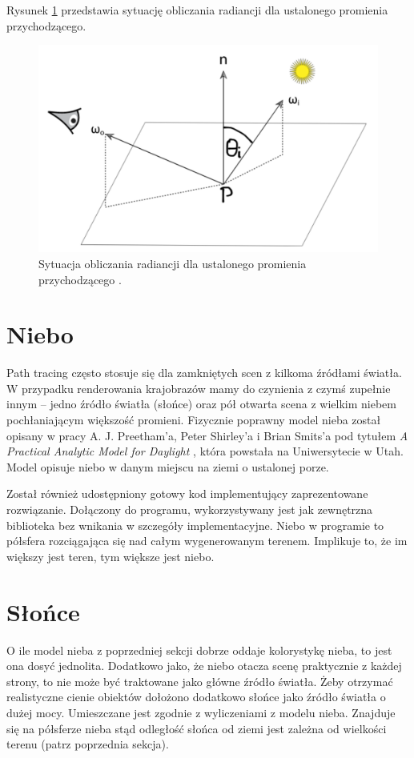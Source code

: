 \documentclass[inz,shortabstract]{iithesis}
\begin{document}
        Rysunek \ref{fig:renderingEquation} przedstawia sytuację obliczania radiancji dla ustalonego promienia przychodzącego.
        
        \begin{figure}[H]
            \includegraphics[width=\linewidth]{renderingEquation.png}
            \caption{Sytuacja obliczania radiancji dla ustalonego promienia przychodzącego \cite{pbrt}.} 
            \label{fig:renderingEquation}
        \end{figure}
        
    \section{Niebo}
        Path tracing często stosuje się dla zamkniętych scen z kilkoma źródłami światła. W przypadku renderowania krajobrazów mamy do czynienia z czymś zupełnie innym -- jedno źródło światła (słońce) oraz pół otwarta scena z wielkim niebem pochłaniającym większość promieni. Fizycznie poprawny model nieba został opisany w pracy  A. J. Preetham'a, 
        Peter Shirley'a i Brian Smits'a pod tytułem \textit{A Practical Analytic Model for Daylight} \cite{sky}, która powstała na Uniwersytecie w Utah. Model opisuje niebo w danym miejscu na ziemi o ustalonej porze. 
        
        Został również udostępniony gotowy kod implementujący zaprezentowane rozwiązanie. Dołączony do programu, wykorzystywany jest jak zewnętrzna biblioteka bez wnikania w szczegóły implementacyjne. Niebo w programie to półsfera rozciągająca się nad całym wygenerowanym terenem. Implikuje to, że im większy jest teren, tym większe jest niebo.
    
    \section{Słońce}
        O ile model nieba z poprzedniej sekcji dobrze oddaje kolorystykę nieba, to jest ona dosyć jednolita. Dodatkowo jako, że niebo otacza scenę praktycznie z każdej strony, to nie może być traktowane jako główne źródło światła. Żeby otrzymać realistyczne cienie obiektów dołożono dodatkowo słońce jako źródło światła o dużej mocy. Umieszczane jest zgodnie z wyliczeniami z modelu nieba. Znajduje się na półsferze nieba stąd odległość słońca od ziemi jest zależna od wielkości terenu (patrz poprzednia sekcja).
        
\end{document}

